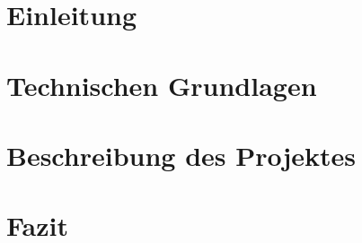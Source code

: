 \chapter{Einleitung}


\chapter{Technischen Grundlagen}


\chapter{Beschreibung des Projektes}


\chapter{Fazit}
